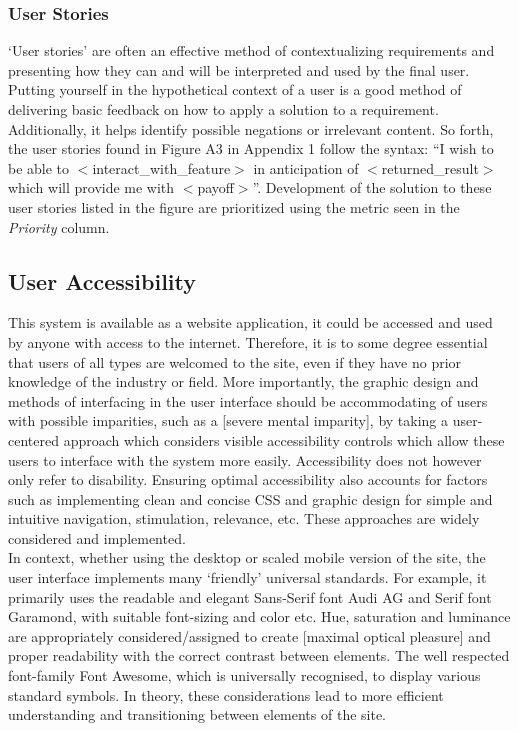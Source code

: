 \documentclass[11pt, english]{article}
\begin{document}
		\subsubsection{User Stories}

	`User stories' are often an effective method of contextualizing requirements and presenting how they can and will be interpreted and used by the final user. Putting yourself in the hypothetical context of a user is a good method of delivering basic feedback on how to apply a solution to a requirement. Additionally, it helps identify possible negations or irrelevant content. So forth, the user stories found in Figure A3 in Appendix 1 follow the syntax: ``I wish to be able to $<$interact\_with\_feature$>$ in anticipation of $<$returned\_result$>$ which will provide me with $<$payoff$>$''. Development of the solution to these user stories listed in the figure are prioritized using the metric seen in the \textit{Priority} column.

	\subsection{User Accessibility}

	This system is available as a website application, it could be accessed and used by anyone with access to the internet. Therefore, it is to some degree essential that users of all types are welcomed to the site, even if they have no prior knowledge of the industry or field. More importantly, the graphic design and methods of interfacing in the user interface should be accommodating of users with possible imparities, such as a [severe mental imparity], by taking a user-centered approach which considers visible accessibility controls which allow these users to interface with the system more easily. Accessibility does not however only refer to disability. Ensuring optimal accessibility also accounts for factors such as implementing clean and concise CSS and graphic design for simple and intuitive navigation, stimulation, relevance, etc. These approaches are widely considered and implemented.\\

	In context, whether using the desktop or scaled mobile version of the site, the user interface implements many `friendly' universal standards. For example, it primarily uses the readable and elegant Sans-Serif font Audi AG and Serif font Garamond, with suitable font-sizing and color etc. Hue, saturation and luminance are appropriately considered/assigned to create [maximal optical pleasure] and proper readability with the correct contrast between elements. The well respected font-family Font Awesome, which is universally recognised, to display various standard symbols. In theory, these considerations lead to more efficient understanding and transitioning between elements of the site.
\end{document}
